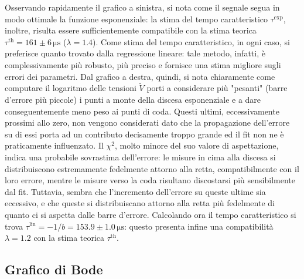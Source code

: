 \documentclass[a4paper,11pt]{article} %
\begin{document}
\noindent Osservando rapidamente il grafico a sinistra, si nota come il segnale segua in modo ottimale la funzione
esponenziale: la stima del tempo caratteristico $\tau^{\text{exp}}$, inoltre, risulta essere sufficientemente
compatibile con la stima teorica $\tau^{\text{th}} = 161 \pm 6 \,\si{\us}$ ($\lambda = 1.4$). Come stima del tempo
caratteristico, in ogni caso, si preferisce quanto trovato dalla regressione lineare: tale metodo, infatti, è
complessivamente più robusto, più preciso e fornisce una stima migliore sugli errori dei parametri. Dal grafico a
destra, quindi, si nota chiaramente come computare il logaritmo delle tensioni $\tilde{V}$ porti a considerare più
"pesanti" (barre d'errore più piccole) i punti a monte della discesa esponenziale e a dare conseguentemente meno peso ai
punti di coda. Questi ultimi, eccessivamente prossimi allo zero, non vengono considerati dato che la propagazione
dell'errore su di essi porta ad un contributo decisamente troppo grande ed il fit non ne è praticamente influenzato. Il
$\chi^2$, molto minore del suo valore di aspettazione, indica una probabile sovrastima dell'errore: le misure in cima
alla discesa si distribuiscono estremamente fedelmente attorno alla retta, compatibilmente con il loro errore, mentre le
misure verso la coda risultano discostarsi più sensibilmente dal fit. Tuttavia, sembra che l'incremento dell'errore su
queste ultime sia eccessivo, e che queste si distribuiscano attorno alla retta più fedelmente di quanto ci si aspetta
dalle barre d'errore. Calcolando ora il tempo caratteristico si trova $\tau^{\text{lin}}= -1/b = 153.9 \pm 1.0
\,\si{\us}$: questo presenta infine una compatibilità $\lambda = 1.2$ con  la stima teorica $\tau^{\text{th}}$.



\subsection{Grafico di Bode}\label{s:preamp_bode}
\end{document}
